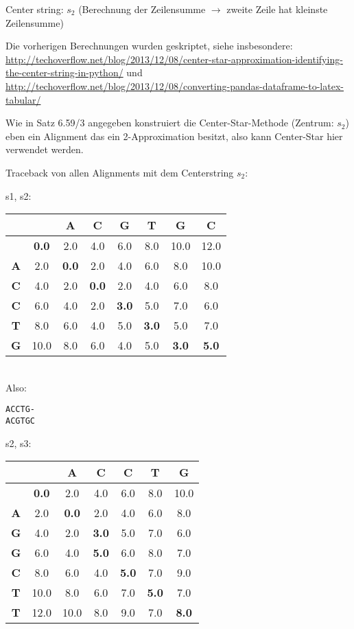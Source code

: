 \documentclass[a4paper,10pt,oneside,reqno]{scrartcl}
\begin{document}
Center string: $s_2$ (Berechnung der Zeilensumme $\rightarrow$ zweite Zeile hat kleinste Zeilensumme)

Die vorherigen Berechnungen wurden geskriptet, siehe insbesondere:\\
\url{http://techoverflow.net/blog/2013/12/08/center-star-approximation-identifying-the-center-string-in-python/} und\\
\url{http://techoverflow.net/blog/2013/12/08/converting-pandas-dataframe-to-latex-tabular/}

Wie in Satz 6.59/3 angegeben konstruiert die Center-Star-Methode (Zentrum: $s_2$) eben ein Alignment das ein 2-Approximation besitzt, also kann Center-Star hier verwendet werden.

Traceback von allen Alignments mit dem Centerstring $s_2$:

s1, s2: \\
\begin{tabular}{c|ccccccc}
& \textbf{ } & \textbf{A} & \textbf{C} & \textbf{G} & \textbf{T} & \textbf{G} & \textbf{C}\\\hline
\textbf{ } & \textbf{0.0} & 2.0 & 4.0 & 6.0 & 8.0 & 10.0 & 12.0\\
\textbf{A} & 2.0 & \textbf{0.0} & 2.0 & 4.0 & 6.0 & 8.0 & 10.0\\
\textbf{C} & 4.0 & 2.0 & \textbf{0.0} & 2.0 & 4.0 & 6.0 & 8.0\\
\textbf{C} & 6.0 & 4.0 & 2.0 & \textbf{3.0} & 5.0 & 7.0 & 6.0\\
\textbf{T} & 8.0 & 6.0 & 4.0 & 5.0 & \textbf{3.0} & 5.0 & 7.0\\
\textbf{G} & 10.0 & 8.0 & 6.0 & 4.0 & 5.0 & \textbf{3.0} & \textbf{5.0}\\
\end{tabular}\\
Also:
\begin{verbatim}
ACCTG-
ACGTGC
\end{verbatim}

s2, s3: \\
\begin{tabular}{c|cccccc}
& \textbf{ } & \textbf{A} & \textbf{C} & \textbf{C} & \textbf{T} & \textbf{G}\\\hline
\textbf{ } & \textbf{0.0} & 2.0 & 4.0 & 6.0 & 8.0 & 10.0\\
\textbf{A} & 2.0 & \textbf{0.0} & 2.0 & 4.0 & 6.0 & 8.0\\
\textbf{G} & 4.0 & 2.0 & \textbf{3.0} & 5.0 & 7.0 & 6.0\\
\textbf{G} & 6.0 & 4.0 & \textbf{5.0} & 6.0 & 8.0 & 7.0\\
\textbf{C} & 8.0 & 6.0 & 4.0 & \textbf{5.0} & 7.0 & 9.0\\
\textbf{T} & 10.0 & 8.0 & 6.0 & 7.0 & \textbf{5.0} & 7.0\\
\textbf{T} & 12.0 & 10.0 & 8.0 & 9.0 & 7.0 & \textbf{8.0}\\
\end{tabular}
\end{document}

